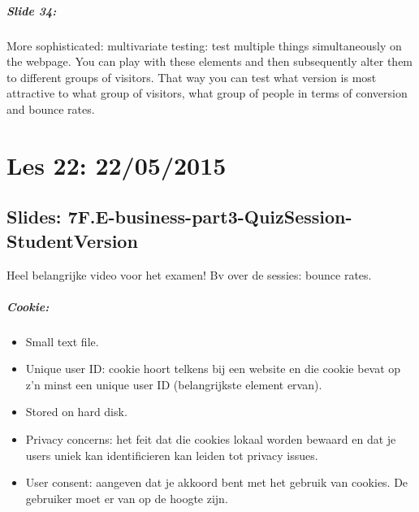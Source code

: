 \documentclass[10pt,a4paper]{report}
\begin{document}
\paragraph{Slide 34:}More sophisticated: multivariate testing: test multiple things simultaneously on the webpage. You can play with these elements and then subsequently alter them to different groups of visitors. That way you can test what version is most attractive to what group of visitors, what group of people in terms of conversion and bounce rates.

\chapter{Les 22: 22/05/2015}
\section{Slides: 7F.E-business-part3-QuizSession-StudentVersion}
Heel belangrijke video voor het examen! Bv over de sessies: bounce rates.

\paragraph{Cookie:}
\begin{itemize}
\item Small text file.
\item Unique user ID: cookie hoort telkens bij een website en die cookie bevat op z'n minst een unique user ID (belangrijkste element ervan).
\item Stored on hard disk.
\item Privacy concerns: het feit dat die cookies lokaal worden bewaard en dat je users uniek kan identificieren kan leiden tot privacy issues.
\item User consent: aangeven dat je akkoord bent met het gebruik van cookies. De gebruiker moet er van op de hoogte zijn.
\end{itemize}
\end{document}
